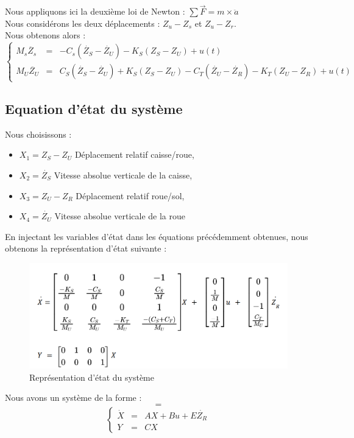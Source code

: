 \documentclass[a4paper,12pt]{insa} %
\begin{document}
Nous appliquons ici la deuxième loi de Newton : $\sum \vec{F} = m\times \ddot{a}$\\
Nous considérons les deux déplacements : $Z_u - Z_s$ et $Z_u - Z_r$.\\
Nous obtenons alors : \\
$$
\left \{
\begin{array}{rcl}
M_s\ddot{Z_s} &=& -C_s(\dot{Z_S}-\dot{Z_U}) -K_S(Z_S -Z_U)+u(t) \\
M_U\ddot{Z_U} &=& C_S(\dot{Z_S}-\dot{Z_U})+K_S(Z_S-Z_U)-C_T(\dot{Z_U}-\dot{Z_R})-K_T(Z_U-Z_R) + u(t)
\end{array}
\right.
$$

\subsection{Equation d'état du système}
Nous choisissons : 
\begin{itemize}
\item $X_1 = Z_S - Z_U$ Déplacement relatif caisse/roue,
\item $X_2 = \dot{Z_S}$ Vitesse absolue verticale de la caisse,
\item $X_3 = Z_U - Z_R$ Déplacement relatif roue/sol,
\item $X_4 = \dot{Z_U}$	Vitesse absolue verticale de la roue
\end{itemize}
En injectant les variables d'état dans les équations précédemment obtenues, nous obtenons la représentation d'état suivante : \\
\begin{center}
    \begin{figure}[ht!]
        \centering
        \includegraphics[width=14cm, keepaspectratio]{figures/sys_etat.png}
        \caption{Représentation d'état du système}
        \label{Représentation d'état du système}
    \end{figure}
\end{center}
Nous avons un système de la forme : 
$$
 = 
$$
$$
\left \{
\begin{array}{rcl}
\dot{X} &=& AX + Bu + E\dot{Z_R} \\
Y &=& CX
\end{array}
\right.
$$
\newpage
\end{document}
